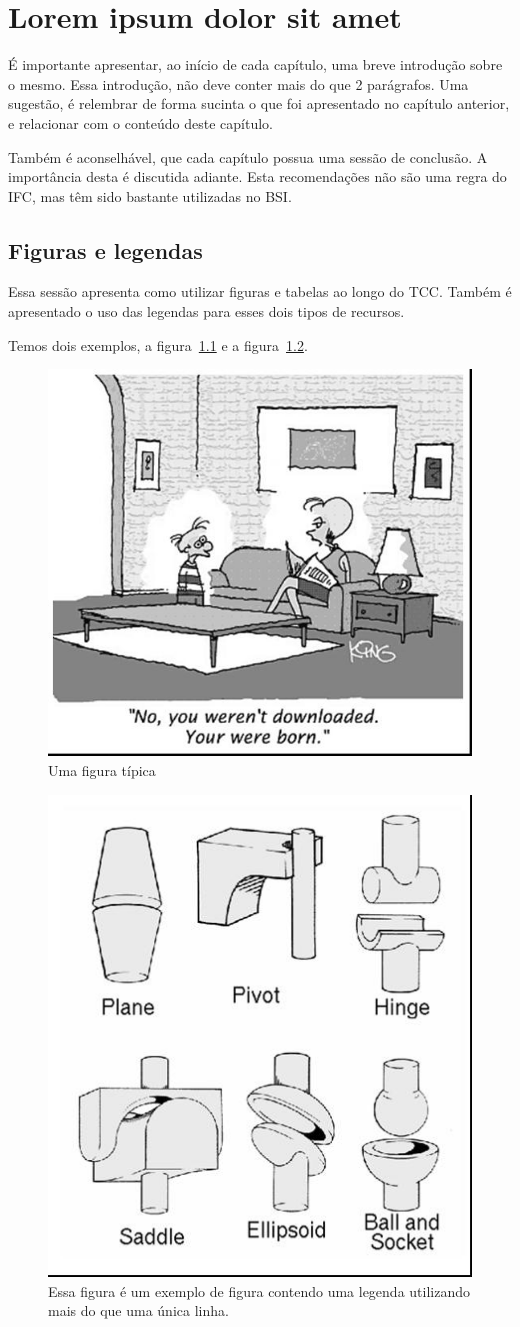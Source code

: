 \chapter{Lorem ipsum dolor sit amet}

É importante apresentar, ao início de cada capítulo, uma breve introdução sobre o mesmo. Essa introdução, não deve conter mais do que 2 parágrafos. Uma sugestão, é relembrar de forma sucinta o que foi apresentado no capítulo anterior, e relacionar com o conteúdo deste capítulo.

Também é aconselhável, que cada capítulo possua uma sessão de conclusão. A importância desta é discutida adiante. Esta recomendações não são uma regra do IFC, mas têm sido bastante utilizadas no BSI. 

\section{Figuras e legendas}\label{sec:figs}

Essa sessão apresenta como utilizar figuras e tabelas ao longo do TCC. Também é apresentado o uso das legendas para esses dois tipos de recursos. 

Temos dois exemplos, a figura~\ref{fig:exemploFig1} e a figura~\ref{fig:exemploFig2}.

\begin{figure}[htbp]
\centering
\includegraphics[width=.5\textwidth]{figuras/fig1.jpg}
\caption{Uma figura típica}
\label{fig:exemploFig1}
\end{figure}

\begin{figure}[htbp]
\centering
\includegraphics[width=.3\textwidth]{figuras/fig2.jpg}
\caption{Essa figura é um exemplo de figura contendo uma legenda utilizando mais do que uma única linha.}
\label{fig:exemploFig2}
\end{figure}


